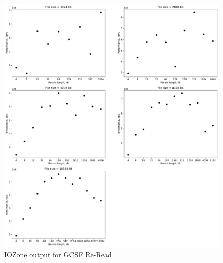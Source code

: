 \begin{figure}[!htb]
	\label{fig:app_bencgcsffs_re_read}
	\begin{center}
		\includegraphics[width=1.0\textwidth]{figures/benchmarking/gcsf/Re-Read.pdf}
	\end{center}
	\caption{IOZone output for \gls{GCSF} Re-Read}
\end{figure}


